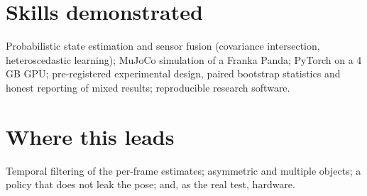 \documentclass[10pt,a4paper]{article}
\begin{document}
\section*{Skills demonstrated}
Probabilistic state estimation and sensor fusion (covariance intersection, heteroscedastic learning); MuJoCo simulation of a Franka Panda; PyTorch on a 4\,GB GPU; pre-registered experimental design, paired bootstrap statistics and honest reporting of mixed results; reproducible research software.

\section*{Where this leads}
Temporal filtering of the per-frame estimates; asymmetric and multiple objects; a policy that does not leak the pose; and, as the real test, hardware.
\end{document}
